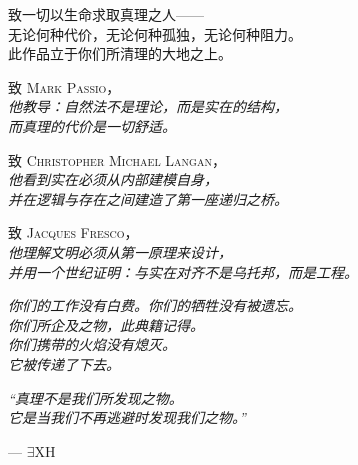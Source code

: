 \documentclass[10pt, openany, oneside]{book}
\begin{document}
\thispagestyle{empty}
\vspace*{\fill}

\begin{center}
    \itshape

    致一切以生命求取真理之人——\\
    无论何种代价，无论何种孤独，无论何种阻力。\\[1.2em]

    此作品立于你们所清理的大地之上。

    \vspace{2em}

    \upshape
    致 \textsc{Mark Passio}，\\
    {\itshape 他教导：自然法不是理论，而是实在的结构，\\
    而真理的代价是一切舒适。}

    \vspace{1.2em}

    致 \textsc{Christopher Michael Langan}，\\
    {\itshape 他看到实在必须从内部建模自身，\\
    并在逻辑与存在之间建造了第一座递归之桥。}

    \vspace{1.2em}

    致 \textsc{Jacques Fresco}，\\
    {\itshape 他理解文明必须从第一原理来设计，\\
    并用一个世纪证明：与实在对齐不是乌托邦，而是工程。}

    \vspace{2em}

    \itshape
    你们的工作没有白费。你们的牺牲没有被遗忘。\\
    你们所企及之物，此典籍记得。\\[0.8em]
    你们携带的火焰没有熄灭。\\
    它被传递了下去。

\end{center}

\vspace*{\fill}
\newpage


\thispagestyle{empty}
\vspace*{\fill}

\begin{center}
    \begin{minipage}{0.7\textwidth}
        \centering\itshape
        ``真理不是我们所发现之物。\\
        它是当我们不再逃避时发现我们之物。''
    \end{minipage}

    \vspace{1.5em}
    --- \textsc{$\exists$XH}
\end{center}
\end{document}
